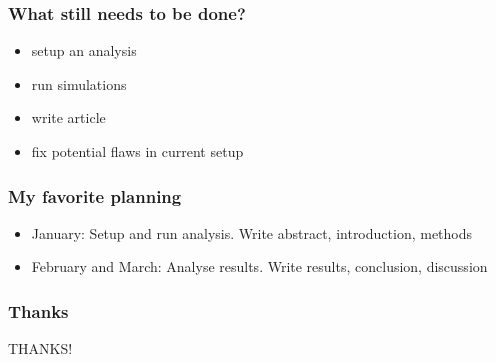 \documentclass{beamer}
\begin{document}
\begin{frame}
  \frametitle{What still needs to be done?}

  \begin{itemize}
    \item setup an analysis
    \item run simulations
    \item write article
    \item fix potential flaws in current setup
  \end{itemize}

\end{frame}

\begin{frame}
  \frametitle{My favorite planning}

  \begin{itemize}
    \item January: Setup and run analysis. Write abstract, introduction, methods
    \item February and March: Analyse results. Write results, conclusion, discussion
  \end{itemize}

\end{frame}


\begin{frame}
  \frametitle{Thanks}
  
  \center
  \Huge
  \faSmileO THANKS! \faSmileO

\end{frame}
\end{document}
